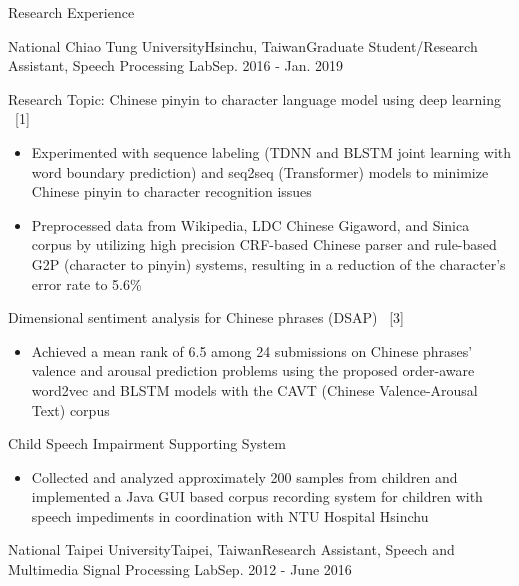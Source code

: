 \documentclass{resume} %
\begin{document}
\begin{rSection}{Research Experience}
    \begin{rSubsection}{National Chiao Tung University}{Hsinchu, Taiwan}{Graduate Student/Research Assistant, Speech Processing Lab}{Sep. 2016 - Jan. 2019}
        \item Research Topic: Chinese pinyin to character language model using deep learning ~[1]
        \begin{itemize}[label=$-$]
            \setlength \itemsep{-0.5em}
            \item Experimented with sequence labeling (TDNN and BLSTM joint learning with word boundary prediction) and seq2seq (Transformer) models to minimize Chinese pinyin to character recognition issues
            \item Preprocessed data from Wikipedia, LDC Chinese Gigaword, and Sinica corpus by utilizing high precision CRF-based Chinese parser and rule-based G2P (character to pinyin) systems, resulting in a reduction of the character’s error rate to 5.6\%
        \end{itemize}\vspace {0.5em}
        \item Dimensional sentiment analysis for Chinese phrases (DSAP) ~[3] 
        \begin{itemize}[label=$-$]
            \setlength \itemsep{-0.5em}
            \item Achieved a mean rank of 6.5 among 24 submissions on Chinese phrases’ valence and arousal prediction problems using the proposed order-aware word2vec and BLSTM models with the CAVT (Chinese Valence-Arousal Text) corpus
        \end{itemize}\vspace {0.5em}
        \item Child Speech Impairment Supporting System
        \begin{itemize}[label=$-$]
            \setlength \itemsep{-0.5em}
            \item Collected and analyzed approximately 200 samples from children and implemented a Java GUI based corpus recording system for children with speech impediments in coordination with NTU Hospital Hsinchu
        \end{itemize}\vspace {0.5em}
    \end{rSubsection}
    \begin{rSubsection}{National Taipei University}{Taipei, Taiwan}{Research Assistant, Speech and Multimedia Signal Processing Lab}{Sep. 2012 - June 2016}

\end{rSubsection}
\end{rSection}
\end{document}

